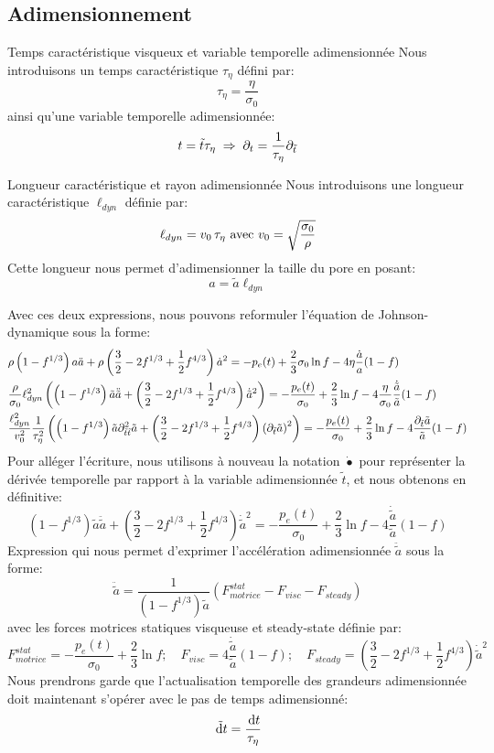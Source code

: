 \documentclass[10pt]{book}
\begin{document}
\subsection{Adimensionnement}
\begin{Not}{Temps caractéristique visqueux et variable temporelle adimensionnée} Nous introduisons un temps caractéristique $\tau_{\eta}$ défini par:
$$\tau_{\eta}=\dfrac{\eta}{\sigma_{0}}$$
ainsi qu'une variable temporelle adimensionnée:
$$t=\tilde{t}\tau_{\eta} \; \Rightarrow \; \partial_{t} = \dfrac{1}{\tau_{\eta}}\partial_{\tilde{t}}$$
\end{Not}
\begin{Not}{Longueur caractéristique et rayon adimensionnée} Nous introduisons une longueur caractéristique $\ell_{dyn}$ définie par:
$$\ell_{dyn}=v_0\,\tau_{\eta} \text{ avec } v_0 = \sqrt{\dfrac{\sigma_0}{\rho}}$$
Cette longueur nous permet d'adimensionner la taille du pore en posant:
$$a = \tilde{a}\ell_{dyn}$$
\end{Not}
Avec ces deux expressions, nous pouvons reformuler l'équation de Johnson-dynamique sous la forme:
$$\begin{aligned}
&\rho \left(1-f^{1/3}\right)a\ddot{a} + \rho \left(\dfrac{3}{2}-2f^{1/3} + \dfrac{1}{2}f^{4/3}\right)\dot{a}^2 = - p_e(t) + \frac{2}{3}\sigma_0\ln{f} - 4\eta\dfrac{\dot{a}}{a}(1-f)\\
&\dfrac{\rho}{\sigma_0}\ell_{dyn}^{2}\left(\left(1-f^{1/3}\right)\tilde{a}\ddot{\tilde{a}} + \left(\dfrac{3}{2}-2f^{1/3} + \dfrac{1}{2}f^{4/3}\right)\dot{\tilde{a}}^2\right)= - \dfrac{p_e(t)}{\sigma_0} + \frac{2}{3}\ln{f} - 4\dfrac{\eta}{\sigma_0}\dfrac{\dot{\tilde{a}}}{\tilde{a}}(1-f)\\
&\dfrac{\ell_{dyn}^{2}}{v_{0}^{2}}\dfrac{1}{\tau_{\eta}^{2}}\left(\left(1-f^{1/3}\right)\tilde{a}\partial^{2}_{\tilde{t}\tilde{t}}\tilde{a} + \left(\dfrac{3}{2}-2f^{1/3} + \dfrac{1}{2}f^{4/3}\right)\left(\partial_{\tilde{t}}\tilde{a}\right)^2\right)= - \dfrac{p_e(t)}{\sigma_0} + \frac{2}{3}\ln{f} -4\dfrac{\partial_{\tilde{t}}{\tilde{a}}}{\tilde{a}}(1-f)
\end{aligned}$$
Pour alléger l'écriture, nous utilisons à nouveau la notation $\dot{\bullet}$ pour représenter la dérivée temporelle par rapport à la variable adimensionnée $\tilde{t}$, et nous obtenons en définitive:
$$\left(1-f^{1/3}\right)\tilde{a}\ddot{\tilde{a}}+  \left(\frac{3}{2}-2f^{1/3} + \frac{1}{2}f^{4/3}\right)\dot{\tilde{a}}^2  = - \dfrac{p_e(t)}{\sigma_0} +    \frac{2}{3}\ln{f} - 4\frac{\dot{\tilde{a}}}{\tilde{a}}(1-f)$$
Expression qui nous permet d'exprimer l'accélération adimensionnée $\ddot{\tilde{a}}$ sous la forme:
$$\ddot{\tilde{a}}=\dfrac{1}{\left(1-f^{1/3}\right)\tilde{a}}\left(F_{motrice}^{stat}-F_{visc}-F_{steady}\right)$$
avec les forces motrices statiques visqueuse et steady-state définie par:
$$F_{motrice}^{stat}=- \dfrac{p_e(t)}{\sigma_0} +    \frac{2}{3}\ln{f}; \quad F_{visc}=4\frac{\dot{\tilde{a}}}{\tilde{a}}(1-f); \quad F_{steady} = \left(\frac{3}{2}-2f^{1/3} + \frac{1}{2}f^{4/3}\right)\dot{\tilde{a}}^2$$
Nous prendrons garde que l'actualisation temporelle des grandeurs adimensionnée doit maintenant s'opérer avec le pas de temps adimensionné:
$$\tilde{\,\mathrm{d}t}=\dfrac{\,\mathrm{d}t}{\tau_{\eta}}$$\\
\end{document}
